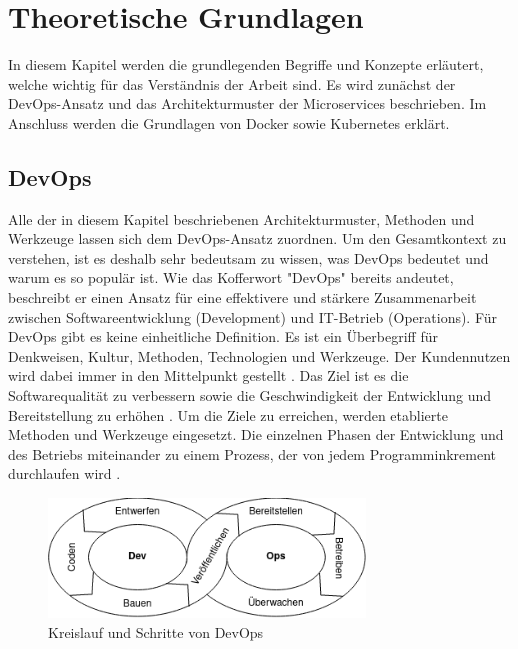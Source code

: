 \section{Theoretische Grundlagen}

In diesem Kapitel werden die grundlegenden Begriffe und Konzepte erläutert, welche wichtig für das Verständnis der Arbeit sind. Es wird zunächst der DevOps-Ansatz und das Architekturmuster der Microservices beschrieben. Im Anschluss werden die Grundlagen von Docker sowie Kubernetes erklärt.

\subsection{DevOps}

Alle der in diesem Kapitel beschriebenen Architekturmuster, Methoden und Werkzeuge lassen sich dem DevOps-Ansatz zuordnen. Um den Gesamtkontext zu verstehen, ist es deshalb sehr bedeutsam zu wissen, was DevOps bedeutet und warum es so populär ist. Wie das Kofferwort "DevOps" bereits andeutet, beschreibt er einen Ansatz für eine effektivere und stärkere Zusammenarbeit zwischen Softwareentwicklung (Development) und IT-Betrieb (Operations). Für DevOps gibt es keine einheitliche Definition. Es ist ein Überbegriff für Denkweisen, Kultur, Methoden, Technologien und Werkzeuge. Der Kundennutzen wird dabei immer in den Mittelpunkt gestellt \parencite[vgl.][S. 1]{halstenbergDevOps2020}. Das Ziel ist es die Softwarequalität zu verbessern sowie die Geschwindigkeit der Entwicklung und Bereitstellung zu erhöhen \parencite[vgl.][S. 6]{arundelCloud2019}. Um die Ziele zu erreichen, werden etablierte Methoden und Werkzeuge eingesetzt. Die einzelnen Phasen der Entwicklung und des Betriebs miteinander zu einem Prozess, der von jedem Programminkrement durchlaufen wird \parencite[vgl.][S. 63]{trempArchitekturen2021}.

\begin{figure}[H] 
    \centering
    \includegraphics[width=0.75\textwidth]{figures/DevOpsKreislauf.png}
    \caption{Kreislauf und Schritte von DevOps \parencite[vgl.][S. 63]{trempArchitekturen2021}}
\end{figure}


